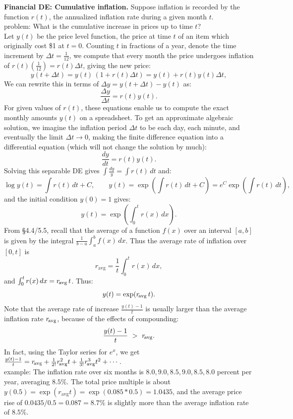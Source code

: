 \documentclass[11pt]{article}
\begin{document}
\newpage

\noindent
{\bf Financial DE: Cumulative inflation.} 
Suppose inflation is recorded by the function $r(t)$,
the annualized inflation rate during a given month $t$.
\\[.5em]
{\sc problem:} What is the cumulative increase in prices up to time $t$? 
\\[.5em] 
Let $y(t)$ be the price level function, the price at time $t$ of an item 
which originally cost \$1 at $t=0$. Counting $t$ in fractions of a year,
denote the time increment by $\Delta t = \frac1{12}$, 
we compute that every month the price undergoes 
inflation of $r(t)(\frac1{12}) = r(t)\Delta t$, giving the new price:
$$
y(t{+}\Delta t) = y(t)\,(1 + r(t)\Delta t) = y(t) + r(t)y(t)\Delta t,
$$
We can rewrite this in terms of $\Delta y=y(t{+}\Delta t)-y(t)$ as:
$$
\frac{\Delta y}{\Delta t} = r(t)y(t).
$$
For given values of $r(t)$, these equations enable us 
to compute the exact monthly amounts $y(t)$ on a spreadsheet.
To get an approximate algebraic solution, 
we imagine the inflation period $\Delta t$ to be
each day, each minute, and eventually the limit $\Delta t\to 0$,
making the finite difference equation into a differential equation 
(which will not change the solution by much):
$$
\frac{dy}{dt} = r(t)y(t).
$$             
Solving this separable DE gives $\int\! \frac{dy}{y} = \int r(t)\,dt$ and:
$$\textstyle
\log y(t) = \int\! r(t)\, dt + C, \qquad 
y(t) = \exp\!\left( \int r(t)\,dt + C\right)  = e^C \exp(\int r(t) \,dt),
$$
and the initial condition $y(0) = 1$ gives:
$$
y(t) = \exp\left(\int_0^t r(x)\,dx\right).
$$
From \S4.4/5.5, recall that the average of a function $f(x)$ over an interval $[a,b]$
is given by the integral $\frac{1}{b-a}\int_a^b f(x)\,dx$. 
Thus the average rate of inflation over $[0,t]$
is 
$$
r_{\text{avg}} = \frac{1}{t}\int_0^t r(x)\,dx,
$$
and $\int_0^t r(x)\,dx   = r_{\text{\!avg}}\, t$. Thus:
$$
y(t) = \exp(r_{\text{\!avg}}\, t).
$$
Note that the average rate of increase $\frac{y(t)-1}t$ is usually 
larger than the average inflation rate  $r_{\text{\!avg}}$, 
because of the effects of compounding:
$$
\frac{y(t)-1}t   \ > \  r_{\text{\!avg}}.
$$
In fact, using the Taylor series for $e^x$, we get
$\frac{y(t)-1}t = r_{\text{\!avg}} + \frac{1}{2!} r_{\text{\!avg}}^2 t
+  \frac{1}{3!} r_{\text{\!avg}}^3 t^2 +\cdots$.
\\[.5em]
{\sc example:} The inflation rate over six months is 
$8.0, 9.0, 8.5, 9.0, 8.5, 8.0$ percent per year, averaging $8.5\%$.
The total price multiple is about 
$y(0.5) = \exp(r_{\!\text{avg}}t) = \exp(0.085\ast 0.5) = 1.0435$,
and the average price rise of $0.0435/0.5 = 0.087 = 8.7\%$ is 
slightly more than the average inflation rate of $8.5\%$.
\end{document}
